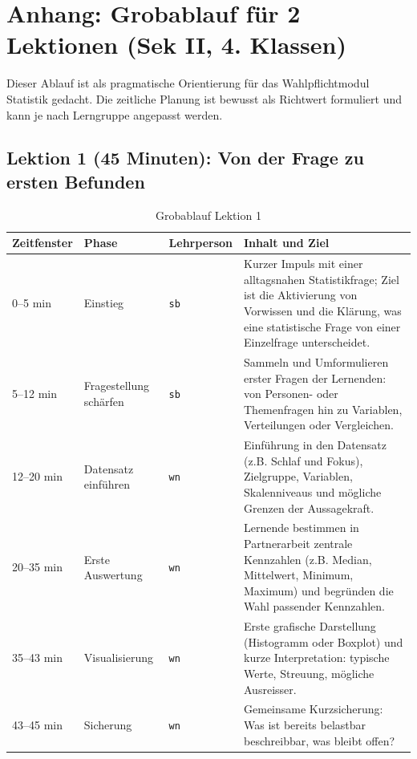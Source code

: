 
\chapter{Anhang: Grobablauf für 2 Lektionen (Sek II, 4. Klassen)}

Dieser Ablauf ist als pragmatische Orientierung für das Wahlpflichtmodul Statistik gedacht.
Die zeitliche Planung ist bewusst als Richtwert formuliert und kann je nach Lerngruppe angepasst werden.

\section{Lektion 1 (45 Minuten): Von der Frage zu ersten Befunden}

\begin{table}[H]
	\centering
	\small
	\begin{tabular}{p{} p{} p{} p{}}
		\toprule
		\textbf{Zeitfenster} & \textbf{Phase} & \textbf{Lehrperson} & \textbf{Inhalt und Ziel} \\
		\midrule
		0--5 min  & Einstieg & \texttt{sb} & Kurzer Impuls mit einer alltagsnahen Statistikfrage; Ziel ist die Aktivierung von Vorwissen und die Klärung, was eine statistische Frage von einer Einzelfrage unterscheidet. \\
		5--12 min & Fragestellung schärfen & \texttt{sb} & Sammeln und Umformulieren erster Fragen der Lernenden: von Personen- oder Themenfragen hin zu Variablen, Verteilungen oder Vergleichen. \\
		12--20 min & Datensatz einführen & \texttt{wn} & Einführung in den Datensatz (z.B. Schlaf und Fokus), Zielgruppe, Variablen, Skalenniveaus und mögliche Grenzen der Aussagekraft. \\
		20--35 min & Erste Auswertung & \texttt{wn} & Lernende bestimmen in Partnerarbeit zentrale Kennzahlen (z.B. Median, Mittelwert, Minimum, Maximum) und begründen die Wahl passender Kennzahlen. \\
		35--43 min & Visualisierung & \texttt{wn} & Erste grafische Darstellung (Histogramm oder Boxplot) und kurze Interpretation: typische Werte, Streuung, mögliche Ausreisser. \\
		43--45 min & Sicherung & \texttt{wn} & Gemeinsame Kurzsicherung: Was ist bereits belastbar beschreibbar, was bleibt offen? \\
		\bottomrule
	\end{tabular}
	\caption{Grobablauf Lektion 1}
\end{table}

